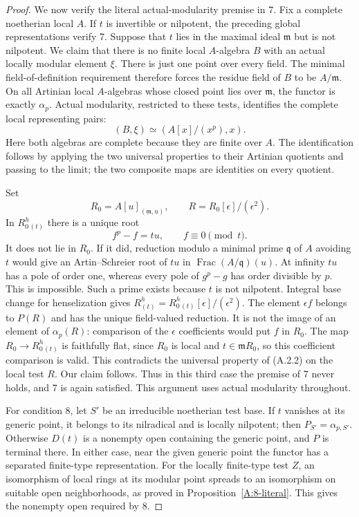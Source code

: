 \begin{proof}
We now verify the literal actual-modularity premise in 7.
Fix a complete noetherian local $A$. If $t$ is invertible or
nilpotent, the preceding global representations verify 7.
Suppose that $t$ lies in the maximal ideal $\mathfrak m$ but
is not nilpotent. We claim that there is no finite local
$A$-algebra $B$ with an actual locally modular element $\xi$.
There is just one point over every field. The minimal
field-of-definition requirement therefore forces the residue
field of $B$ to be $A/\mathfrak m$.
On all Artinian local $A$-algebras whose closed point lies over
$\mathfrak m$, the functor is exactly $\alpha_p$. Actual
modularity, restricted to these tests, identifies the complete
local representing pairs:
\[
 (B,\xi)\simeq (A[x]/(x^p),x).                 \tag{A.2.2}
\]
Here both algebras are complete because they are finite over $A$.
The identification follows by applying the two universal
properties to their Artinian quotients and passing to the limit;
the two composite maps are identities on every quotient.

Set
\[
 R_0=A[u]_{(\mathfrak m,u)},\qquad
 R=R_0[\epsilon]/(\epsilon^2).
\]
In $R_0^h{}_{(t)}$ there is a unique root
\[
 f^p-f=tu,\qquad f\equiv0\pmod t.
\]
It does not lie in $R_0$. If it did, reduction modulo a minimal
prime $\mathfrak q$ of $A$ avoiding $t$ would give an
Artin--Schreier root of $tu$ in
$\operatorname{Frac}(A/\mathfrak q)(u)$. At infinity $tu$ has
a pole of order one, whereas every pole of $g^p-g$ has order
divisible by $p$. This is impossible. Such a prime exists because
$t$ is not nilpotent.
Integral base change for henselization gives
$R^h_{(t)}=R_0^h{}_{(t)}[\epsilon]/(\epsilon^2)$.
The element $\epsilon f$ belongs to $P(R)$ and has the unique
field-valued reduction. It is not the image of an element of
$\alpha_p(R)$: comparison of the $\epsilon$ coefficients would
put $f$ in $R_0$. The map $R_0\to R_0^h{}_{(t)}$ is faithfully
flat, since $R_0$ is local and $t\in\mathfrak mR_0$, so this
coefficient comparison is valid. This contradicts the universal
property of (A.2.2) on the local test $R$. Our claim follows.
Thus in this third case the premise of 7 never holds, and 7 is
again satisfied. This argument uses actual modularity throughout.

For condition 8, let $S'$ be an irreducible noetherian test base.
If $t$ vanishes at its generic point, it belongs to its
nilradical and is locally nilpotent; then $P_{S'}=\alpha_{p,S'}$.
Otherwise $D(t)$ is a nonempty open containing the generic point,
and $P$ is terminal there. In either case, near the given generic
point the functor has a separated finite-type representation.
For the locally finite-type test $Z$, an isomorphism of local
rings at its modular point spreads to an isomorphism on suitable
open neighborhoods, as proved in Proposition~\ref{A:8-literal}.
This gives the nonempty open required by 8.


\end{proof}
